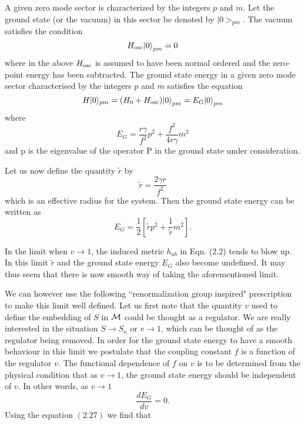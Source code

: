 \documentclass[a4paper,12pt]{article}
\begin{document}

A given zero mode sector is characterized by the integers
$p$ and $m$. Let the ground state (or the vacuum) in this sector 
be denoted by $|0>_{pm}$. The vacuum satisfies the
condition
\begin{equation}
H_{\rm osc}|0{\rangle}_{pm} = 0
\end{equation}
where in the above $H_{\rm osc}$ is assumed to have been normal ordered and
the zero-point energy has been subtracted. 
The ground state energy in a given zero mode sector 
characterised by the integers $p$ and $m$ satisfies the equation
\begin{equation}
H|0 \rangle_{pm}= (H_0 + H_{\rm osc})|0 {\rangle}_{pm} 
= E_G|0 {\rangle}_{pm}
\end{equation}
where
\begin{equation}
E_G=\frac{r{\gamma}}{f^2} p^2 + \frac{f^2}{4r{\gamma}}m^2
\end{equation}
and  p is the eigenvalue of the operator P in the ground state under
consideration.

Let us now define the quantity ${\tilde r}$ by
\begin{equation}
{\tilde r}=\frac{2{\gamma}r}{f^2}
\end{equation}
which is an effective radius for the system.
Then the ground state energy can be written as
\begin{equation}
E_G=\frac{1}{2}[{\tilde r}p^2 + \frac{1}{{\tilde r}}m^2].
\end{equation}

In  the limit when $v \rightarrow 1$, the induced metric $h_{ab}$ in
Eqn. (2.2)
tends to blow up. In this limit ${\tilde r}$ and the ground state
energy $E_G$ also become undefined. It may thus seem that there is now
smooth way of taking the aforementioned limit. 

We can however use the following ``renormalization group inspired"
prescription to make this limit well defined. Let us first note that
 the quantity $v$ used to define the embedding of $S$ in ${\cal M}$ 
 could be thought as a regulator.
We are really interested in the situation $S \rightarrow S_n$ or
$v \rightarrow 1$, which can be thought of as the regulator being removed.   
In order for the ground state energy to have a
smooth behaviour in this limit we postulate that               
 the coupling constant $f$ is  a function of the regulator $v$.
The functional dependence of $f$ on $v$ is to be determined from the
physical condition that as $v \rightarrow 1$,
the ground state energy should
be independent of $v$. In other words, as 
$v \rightarrow 1$
\begin{equation}
\frac{dE_G}{dv}=0.
\end{equation}
Using the equation $(2.27)$ we find that
\end{document}
